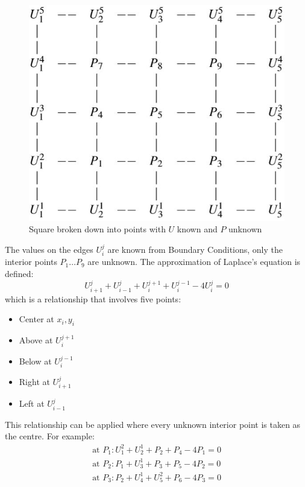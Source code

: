 \documentclass[10pt,a4paper]{article}
\begin{document}
\begin{figure} [h!]
    \centering
    \includegraphics[scale=0.4]{Square_broken.JPG}
    \caption{Square broken down into points with $U$ known and $P$ unknown}
\end{figure}

The values on the edges $U_i^j$ are known from Boundary Conditions, only the interior points $P_1
\dots P_9$ are unknown. The approximation of Laplace's equation is defined: 
$$
    U_{i+1}^j + U_{i-1}^j + U_i^{j+1} + U_i^{j-1} - 4U_i^j = 0
$$
which is a relationship that involves five points: 
\begin{itemize}
    \item Center at $x_i,y_i$
    \item Above at $U_i^{j+1}$
    \item Below at $U_i^{j-1}$
    \item Right at $U_{i+1}^j$
    \item Left at $U_{i-1}^j$
\end{itemize} 

This relationship can be applied where every unknown interior point is taken as the centre. For example:
\begin{align*}
    \text{at } P_1: U_1^2+U_2^1+P_2+P_4-4P_1 = 0 \\
    \text{at } P_2: P_1+U_3^1+P_3+P_5-4P_2 = 0 \\
    \text{at } P_3: P_2+U_4^1+U_5^2+P_6-4P_3 = 0 
\end{align*}
\end{document}
